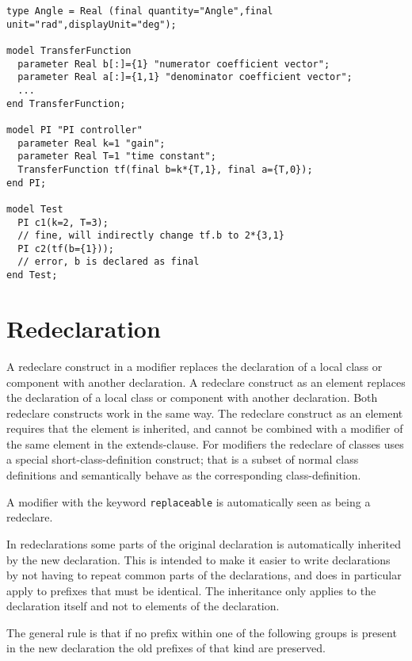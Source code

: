 \begin{example}
\begin{lstlisting}[language=modelica]
type Angle = Real (final quantity="Angle",final unit="rad",displayUnit="deg");

model TransferFunction
  parameter Real b[:]={1} "numerator coefficient vector";
  parameter Real a[:]={1,1} "denominator coefficient vector";
  ...
end TransferFunction;

model PI "PI controller"
  parameter Real k=1 "gain";
  parameter Real T=1 "time constant";
  TransferFunction tf(final b=k*{T,1}, final a={T,0});
end PI;

model Test
  PI c1(k=2, T=3);
  // fine, will indirectly change tf.b to 2*{3,1}
  PI c2(tf(b={1}));
  // error, b is declared as final
end Test;
\end{lstlisting}
\end{example}

\section{Redeclaration}\label{redeclaration}

A redeclare construct in a modifier replaces the declaration of a local
class or component with another declaration. A redeclare construct as an
element replaces the declaration of a local class or component with
another declaration. Both redeclare constructs work in the same way. The
redeclare construct as an element requires that the element is
inherited, and cannot be combined with a modifier of the same element in
the extends-clause. For modifiers the redeclare of classes uses a
special short-class-definition construct; that is a subset of normal
class definitions and semantically behave as the corresponding
class-definition.

A modifier with the keyword \lstinline!replaceable! is automatically seen as being a
redeclare.

In redeclarations some parts of the original declaration is
automatically inherited by the new declaration. This is intended to make
it easier to write declarations by not having to repeat common parts of
the declarations, and does in particular apply to prefixes that must be
identical. The inheritance only applies to the declaration itself and
not to elements of the declaration.

The general rule is that if no prefix within one of the following groups
is present in the new declaration the old prefixes of that kind are
preserved.

